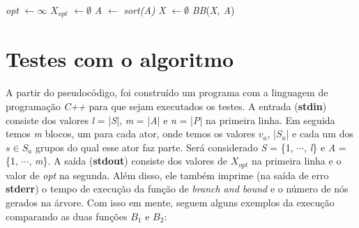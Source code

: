 \documentclass{article}
\begin{document}
\begin{algorithm}
    \DontPrintSemicolon

    \emph{opt} $\leftarrow \infty$ \;
    \emph{$X_{opt}$} $\leftarrow \emptyset$ \; 
    \emph{A} $\leftarrow$ \emph{sort(A)} \;
    \emph{X} $\leftarrow \emptyset$ \; 
    \emph{BB}(\emph{X, A}) \; \;

\end{algorithm}
\pagebreak

\section{Testes com o algoritmo}

\paragraph{} A partir do pseudocódigo, foi construído um programa com a linguagem de programação \emph{C++} para que sejam executados os testes. A entrada (\textbf{stdin}) consiste dos valores \emph{l} = |\emph{S}|, \emph{m} = |\emph{A}| e \emph{n} = |\emph{P}| na primeira linha. Em seguida temos \emph{m} blocos, um para cada ator, onde temos os valores \emph{$v_a$}, |\emph{$S_a$}| e cada um dos \emph{$s \in S_a$} grupos do qual esse ator faz parte. Será considerado \emph{S} = \{1, $\cdots$, \emph{l}\} e \emph{A} = \{1, $\cdots$, \emph{m}\}. A saída (\textbf{stdout}) consiste dos valores de \emph{$X_{opt}$} na primeira linha e o valor de \emph{opt} na segunda. Além disso, ele também imprime (na saída de erro \textbf{stderr}) o tempo de execução da função de \emph{branch and bound} e o número de nós gerados na árvore. Com isso em mente, seguem alguns exemplos da execução comparando as duas funções \emph{$B_1$} e \emph{$B_2$}:
\end{document}
